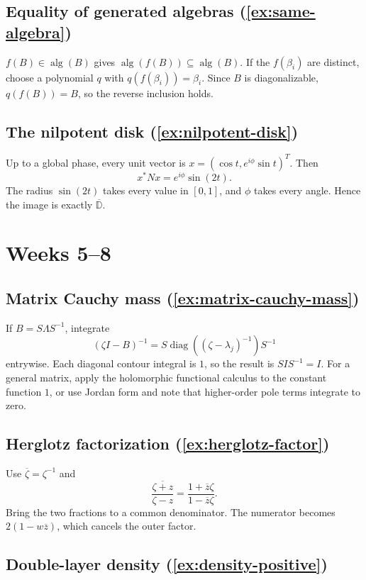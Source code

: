 \documentclass[11pt,oneside,openany]{book}
\theoremstyle{definition}
\theoremstyle{remark}
\newcommand{\D}{\mathbb D}
\newcommand{\alg}{\operatorname{alg}}
\newcommand{\diag}{\operatorname{diag}}
\newcommand{\olD}{\overline{\D}}
\begin{document}
\subsection*{Equality of generated algebras (\cref{ex:same-algebra})}

\(f(B)\in\alg(B)\) gives
\(\alg(f(B))\subseteq\alg(B)\).  If the \(f(\beta_i)\) are distinct,
choose a polynomial \(q\) with \(q(f(\beta_i))=\beta_i\).  Since \(B\)
is diagonalizable, \(q(f(B))=B\), so the reverse inclusion holds.

\subsection*{The nilpotent disk (\cref{ex:nilpotent-disk})}

Up to a global phase, every unit vector is
\(
x=(\cos t,e^{i\phi}\sin t)^T
\).
Then
\[
  x^*Nx=e^{i\phi}\sin(2t).
\]
The radius \(\sin(2t)\) takes every value in \([0,1]\), and \(\phi\)
takes every angle.  Hence the image is exactly \(\olD\).

\section{Weeks 5--8}

\subsection*{Matrix Cauchy mass (\cref{ex:matrix-cauchy-mass})}

If \(B=S\Lambda S^{-1}\), integrate
\[
  (\zeta I-B)^{-1}
  =S\diag((\zeta-\lambda_j)^{-1})S^{-1}
\]
entrywise.  Each diagonal contour integral is \(1\), so the result is
\(SIS^{-1}=I\).  For a general matrix, apply the holomorphic
functional calculus to the constant function \(1\), or use Jordan
form and note that higher-order pole terms integrate to zero.

\subsection*{Herglotz factorization (\cref{ex:herglotz-factor})}

Use \(\overline\zeta=\zeta^{-1}\) and
\[
  \overline{\frac{\zeta+z}{\zeta-z}}
  =\frac{1+\overline z\zeta}{1-\overline z\zeta}.
\]
Bring the two fractions to a common denominator.  The numerator
becomes \(2(1-w\overline z)\), which cancels the outer factor.

\subsection*{Double-layer density (\cref{ex:density-positive})}
\end{document}
